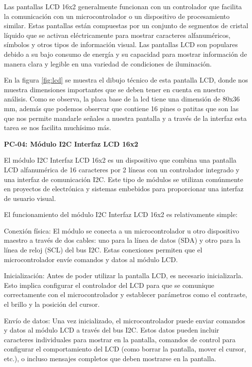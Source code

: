     Las pantallas LCD 16x2 generalmente funcionan con un controlador que facilita la comunicación con un microcontrolador o un dispositivo de procesamiento similar. Estas pantallas están compuestas por un conjunto de segmentos de cristal líquido que se activan eléctricamente para mostrar caracteres alfanuméricos, símbolos y otros tipos de información visual. Las pantallas LCD son populares debido a su bajo consumo de energía y su capacidad para mostrar información de manera clara y legible en una variedad de condiciones de iluminación.
    
    
    En la figura \ref{fig:lcd} se muestra el dibujo técnico de esta pantalla LCD, donde nos muestra dimensiones importantes que se deben tener en cuenta en nuestro análisis. Como se observa, la placa base de la lcd tiene una dimensión de 80x36 mm, además que podemos observar que contiene 16 pines o patitas que son las que nos permite mandarle señales a nuestra pantalla y a través de la interfaz esta tarea se nos facilita muchísimo más.
    
    
    
    \textbf{PC-04: Módulo I2C Interfaz LCD 16x2 }
    
    El módulo I2C Interfaz LCD 16x2 es un dispositivo que combina una pantalla LCD alfanumérica de 16 caracteres por 2 líneas con un controlador integrado y una interfaz de comunicación I2C. Este tipo de módulos se utilizan comúnmente en proyectos de electrónica y sistemas embebidos para proporcionar una interfaz de usuario visual.
    
    El funcionamiento del módulo I2C Interfaz LCD 16x2 es relativamente simple:
    
    Conexión física: El módulo se conecta a un microcontrolador u otro dispositivo maestro a través de dos cables: uno para la línea de datos (SDA) y otro para la línea de reloj (SCL) del bus I2C. Estas conexiones permiten que el microcontrolador envíe comandos y datos al módulo LCD.
    
    Inicialización: Antes de poder utilizar la pantalla LCD, es necesario inicializarla. Esto implica configurar el controlador del LCD para que se comunique correctamente con el microcontrolador y establecer parámetros como el contraste, el brillo y la posición del cursor.
    
    Envío de datos: Una vez inicializado, el microcontrolador puede enviar comandos y datos al módulo LCD a través del bus I2C. Estos datos pueden incluir caracteres individuales para mostrar en la pantalla, comandos de control para configurar el comportamiento del LCD (como borrar la pantalla, mover el cursor, etc.), o incluso mensajes completos que deben mostrarse en la pantalla.
    
